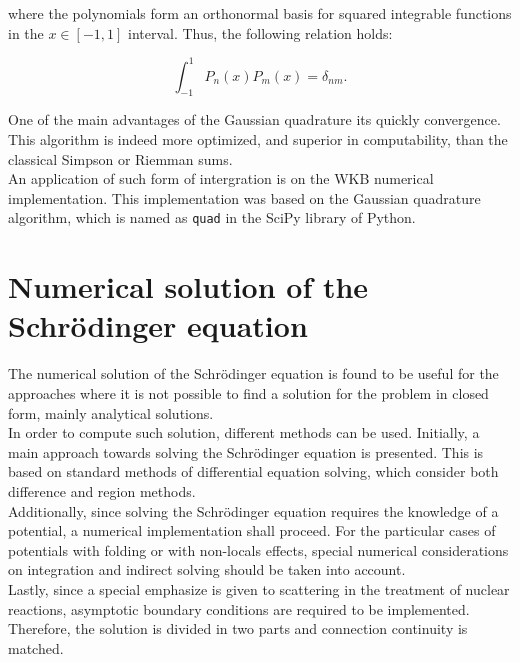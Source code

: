 \documentclass[openany]{book}
\begin{document}
where the polynomials form an orthonormal basis for squared integrable functions in the $x \in [-1,1]$ interval. Thus, the following relation holds: 

\begin{equation}\label{eq:numericalIntegration_gaussianQuadrature_Legendre_normalization}
	\int_{-1}^{1} P_n(x) P_m(x) = \delta_{nm}. 
\end{equation}

One of the main advantages of the Gaussian quadrature its quickly convergence. This algorithm is indeed more optimized, and superior in computability, than the classical Simpson or Riemman sums. \\

An application of such form of intergration is on the WKB numerical implementation. This implementation was based on the Gaussian quadrature algorithm, which is named as \texttt{quad} in the SciPy library of Python. \\

\section{Numerical solution of the Schrödinger equation} \label{sec:schrodingerSolution}

The numerical solution of the Schrödinger equation is found to be useful for the approaches where it is not possible to find a solution for the problem in closed form, mainly analytical solutions.  \\ 

In order to compute such solution, different methods can be used. Initially, a main approach towards solving the Schrödinger equation is presented. This is based on standard methods of differential equation solving, which consider both difference and region methods. \\

Additionally, since solving the Schrödinger equation requires the knowledge of a potential, a numerical implementation shall proceed. For the particular cases of potentials with folding or with non-locals effects, special numerical considerations on integration and indirect solving should be taken into account. \\

Lastly, since a special emphasize is given to scattering in the treatment of nuclear reactions, asymptotic boundary conditions are required to be implemented. Therefore, the solution is divided in two parts and connection continuity is matched.  \\
\end{document}
